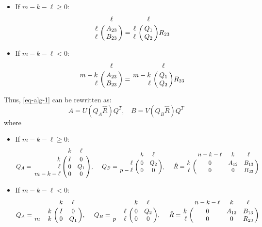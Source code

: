     \begin{itemize}
    	\item If $m-k-\ell \geq 0$:
	    	\[
                \bordermatrix{ & \ell  \cr
                    \hfill \ell & A_{23}  \cr
                    \hfill \ell & B_{23} \cr} = 
                \bordermatrix{ & \ell  \cr
                    \hfill \ell & Q_{1}  \cr
                    \hfill \ell & Q_{2} \cr}R_{23}   
        	\]
    	\item If $m-k-\ell < 0$:  
			\[
                \bordermatrix{ & \ell  \cr
                    \hfill m-k & A_{23}  \cr
                    \hfill \ell & B_{23} \cr} = 
                \bordermatrix{ & \ell  \cr
                    \hfill m-k & Q_{1}  \cr
                    \hfill \ell & Q_{2} \cr}R_{23}   
        	\]          
    \end{itemize}
            Thus, \eqref {eq-alg-1} can be rewritten as:
            \begin{equation} \label{eq-alg-2}
                A = U(Q_{A}\hat{R})Q^{T}, \ \ \ \ B = V(Q_{B}\hat{R})Q^{T}
            \end{equation}
            where 
            \begin{itemize}
            	\item If $m-k-\ell \geq 0$:
					\[
                        Q_{A} = \bordermatrix{ & k & \ell \cr
                        \hfill k & I & 0 \cr
                        \hfill \ell & 0 & Q_1 \cr
                        \hfill m-k-\ell & 0 & 0}, \  \ \ \
                        Q_{B} = \bordermatrix{ & k & \ell   \cr
                        \hfill \ell & 0 & Q_2\cr
                        \hfill p-\ell & 0 & 0}, \ \ \ \
                        \hat{R} = \bordermatrix{ & n-k-\ell & k & \ell \cr
                        \hfill k & 0 & A_{12} & B_{13} \cr
                        \hfill \ell & 0 & 0 & R_{23}}
            		\]
				\item If $m-k-\ell < 0$:  
					\[
                        Q_{A} = \bordermatrix{ & k & \ell \cr
                        \hfill k & I & 0 \cr
                        \hfill m-k & 0 & Q_1}, \  \ \ \
                        Q_{B} = \bordermatrix{ & k & \ell   \cr
                        \hfill \ell & 0 & Q_2\cr
                        \hfill p-\ell & 0 & 0}, \ \ \ \
                        \hat{R} = \bordermatrix{ & n-k-\ell & k & \ell \cr
                        \hfill k & 0 & A_{12} & B_{13} \cr
                        \hfill \ell & 0 & 0 & R_{23}}
            		\]
            \end{itemize}
        
